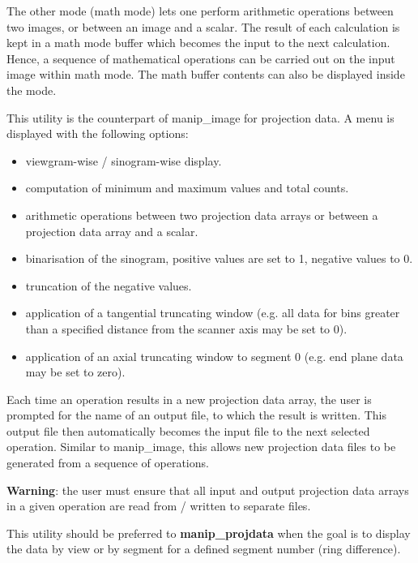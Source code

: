 \documentclass{article}
\begin{document}
The other mode (math mode) lets one perform arithmetic operations 
between two images, or between an image and a scalar. The result 
of each calculation is kept in a math mode buffer which becomes 
the input to the next calculation. Hence, a sequence of mathematical 
operations can be carried out on the input image within math 
mode. The math buffer contents can also be displayed inside the 
mode.

{ 
}

This utility is the counterpart of manip\_image for projection 
data. A menu is displayed with the following options:

\begin{itemize}
\item viewgram-wise / sinogram-wise display.
\item computation of minimum and maximum values and total counts.
\item arithmetic operations between two projection data arrays or 
between a projection data array and a scalar.
\item binarisation of the sinogram, positive values are set to 1, 
negative values to 0.
\item truncation of the negative values.
\item application of a tangential truncating window (e.g. all data 
for bins greater than a specified distance from the scanner axis 
may be set to 0).
\item application of an axial truncating window to segment 0 (e.g. 
end plane data may be set to zero).
\end{itemize}

Each time an operation results in a new projection data array, 
the user is prompted for the name of an output file, to which 
the result is written. This output file then automatically becomes 
the input file to the next selected operation. Similar to manip\_image, 
this allows new projection data files to be generated from a 
sequence of operations.


\textbf{Warning}: the user must ensure that all input and output projection 
data arrays in a given operation are read from / written to separate 
files.

{ 
}

This utility should be preferred to \textbf{manip\_projdata} when the 
goal is to display the data by view or by segment for a defined 
segment number (ring difference).
\end{document}
